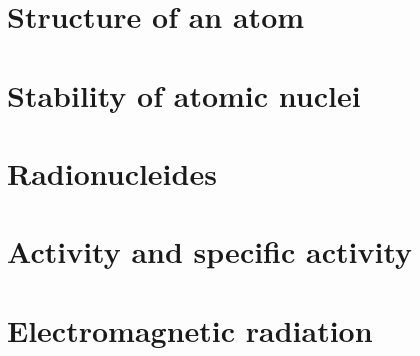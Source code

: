 \section{Structure of an atom}

\section{Stability of atomic nuclei}
\section{Radionucleides}
\section{Activity and specific activity}
\section{Electromagnetic radiation}%
